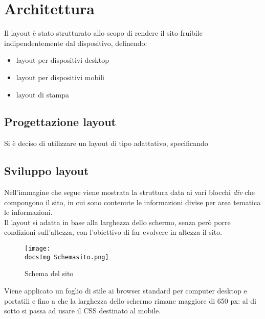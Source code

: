 \section{Architettura}{
	Il layout è stato strutturato allo scopo di rendere il sito fruibile indipendentemente dal dispositivo, definendo:
	\begin{itemize}\itemsep1pt
		\item layout per dispositivi desktop
		\item layout per dispositivi mobili
		\item layout di stampa
	\end{itemize} 
	
	\subsection{Progettazione layout}{
		Si è deciso di utilizzare un layout di tipo adattativo, specificando 
	}
	\subsection{Sviluppo layout}{
		Nell'immagine che segue viene mostrata la struttura data ai vari blocchi \textit{div} che compongono il sito, in cui sono contenute le informazioni divise per area tematica le informazioni.
	\\
	Il layout si adatta in base alla larghezza dello schermo, senza però porre condizioni sull'altezza, con l'obiettivo di far evolvere in altezza il sito.
		\begin{figure}[H]
			\texttt{[image: \\docsImg Schemasito.png]}
			\caption{Schema del sito}
			\label{Schema del sito}
		\end{figure}
		
		Viene applicato un foglio di stile ai browser standard per computer desktop e portatili e fino a che la larghezza dello schermo rimane maggiore di 650 px: al di sotto si passa ad usare il CSS destinato al mobile.
		
}}
